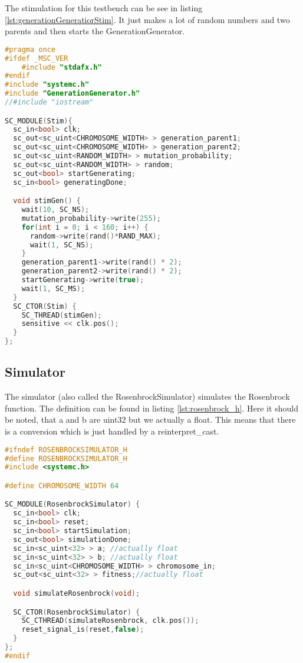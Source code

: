 The stimulation for this testbench can be see in listing \ref{lst:generationGeneratiorStim}. It just makes a lot of random numbers and two parents and then starts the GenerationGenerator.

\begin{lstlisting}[language=C++,caption={Stimulation for Generationgenerator},label={lst:generationGeneratiorStim}]
#pragma once
#ifdef _MSC_VER
	#include "stdafx.h"
#endif
#include "systemc.h"
#include "GenerationGenerator.h"
//#include "iostream"

SC_MODULE(Stim){
  sc_in<bool> clk;
  sc_out<sc_uint<CHROMOSOME_WIDTH> > generation_parent1;
  sc_out<sc_uint<CHROMOSOME_WIDTH> > generation_parent2;
  sc_out<sc_uint<RANDOM_WIDTH> > mutation_probability;
  sc_out<sc_uint<RANDOM_WIDTH> > random;
  sc_out<bool> startGenerating;
  sc_in<bool> generatingDone;

  void stimGen() {
    wait(10, SC_NS);
    mutation_probability->write(255);
    for(int i = 0; i < 160; i++) {
      random->write(rand()*RAND_MAX);
      wait(1, SC_NS);
    }
    generation_parent1->write(rand() * 2);
    generation_parent2->write(rand() * 2);
    startGenerating->write(true);
    wait(1, SC_MS);
  }
  SC_CTOR(Stim) {
    SC_THREAD(stimGen);
    sensitive << clk.pos();
  }
};
\end{lstlisting}


\subsection{Simulator}
The simulator (also called the RosenbrockSimulator) simulates the Rosenbrock function. The definition can be found in listing \ref{lst:rosenbrock_h}. Here it should be noted, that a and b are uint32 but we actually a float. This means that there is a conversion which is just handled by a reinterpret\_cast.

\begin{lstlisting}[language=C++,caption={RosenbrockSimulator.h},label={lst:rosenbrock_h}]
#ifndef ROSENBROCKSIMULATOR_H
#define ROSENBROCKSIMULATOR_H
#include <systemc.h>

#define CHROMOSOME_WIDTH 64

SC_MODULE(RosenbrockSimulator) {
  sc_in<bool> clk;
  sc_in<bool> reset;
  sc_in<bool> startSimulation;
  sc_out<bool> simulationDone;
  sc_in<sc_uint<32> > a; //actually float
  sc_in<sc_uint<32> > b; //actually float
  sc_in<sc_uint<CHROMOSOME_WIDTH> > chromosome_in;
  sc_out<sc_uint<32> > fitness;//actually float

  void simulateRosenbrock(void);

  SC_CTOR(RosenbrockSimulator) {
    SC_CTHREAD(simulateRosenbrock, clk.pos());
    reset_signal_is(reset,false);
  }
};
#endif
\end{lstlisting}

